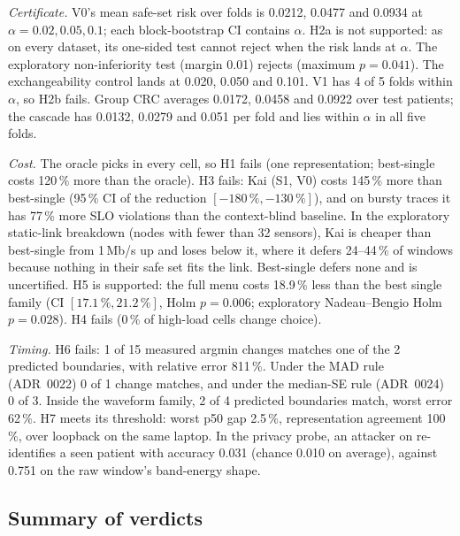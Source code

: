\emph{Certificate.} V0's mean safe-set risk over folds is 0.0212, 0.0477 and 0.0934 at
$\alpha = 0.02, 0.05, 0.1$; each block-bootstrap CI contains $\alpha$. H2a is not supported: as on
every dataset, its one-sided test cannot reject when the risk lands at $\alpha$. The exploratory non-inferiority test (margin 0.01) rejects (maximum
$p = 0.041$). The exchangeability control lands at 0.020, 0.050 and 0.101. V1 has 4 of 5 folds
within $\alpha$, so H2b fails. Group CRC\expl{} averages 0.0172, 0.0458 and 0.0922 over test
patients; the cascade\expl{} has 0.0132, 0.0279 and 0.051 per fold and lies within $\alpha$ in all
five folds.

\emph{Cost.} The oracle picks  in every cell, so H1 fails (one representation; best-single
costs 120\,\% more than the oracle). H3 fails: Kai (S1, V0) costs 145\,\% more than best-single
(95\,\% CI of the reduction $[-180\,\%, -130\,\%]$), and on bursty traces it has 77\,\% more SLO
violations than the context-blind baseline. In the exploratory static-link breakdown (nodes with
fewer than 32 sensors), Kai is cheaper than best-single from 1\,Mb/s up and loses below it, where it defers 24--44\,\% of windows
because nothing in their safe set fits the link. Best-single defers none and is uncertified. H5 is
supported: the full menu costs 18.9\,\% less than the best single family (CI $[17.1\,\%, 21.2\,\%]$,
Holm $p = 0.006$; exploratory Nadeau--Bengio Holm $p = 0.028$). H4 fails (0\,\% of high-load
cells change choice).

\emph{Timing.} H6 fails: 1 of 15 measured argmin changes matches one of the 2 predicted boundaries,
with relative error 811\,\%. Under the MAD rule\expl{} (ADR~0022) 0 of 1 change matches, and
under the median-SE rule\expl{} (ADR~0024) 0 of 3. Inside the waveform family\expl, 2 of 4
predicted boundaries match, worst error 62\,\%. H7 meets its threshold: worst p50 gap 2.5\,\%,
representation agreement 100\,\%, over loopback on the same laptop. In the privacy
probe\expl{}, an attacker on  re-identifies a seen patient with accuracy 0.031 (chance
0.010 on average), against 0.751 on the raw window's band-energy shape.

\subsection{Summary of verdicts}


